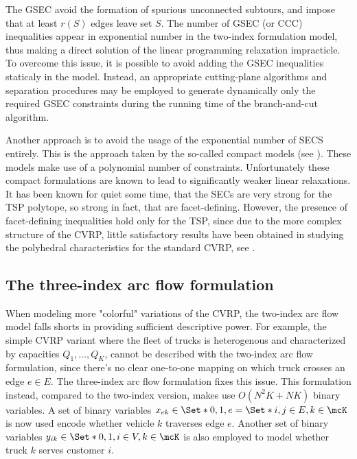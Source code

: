 The GSEC avoid the formation of spurious unconnected subtours, and impose that at least $r(S)$ edges leave set $S$.
The number of GSEC (or CCC) inequalities appear in exponential number in the two-index formulation model,
thus making a direct solution of the linear programming relaxation impracticle.
To overcome this issue, it is possible to avoid adding the GSEC inequalities staticaly in the model.
Instead, an appropriate cutting-plane algorithms and separation procedures may be employed to generate dynamically only the required
GSEC constraints during the running time of the branch-and-cut algorithm.

Another approach is to avoid the usage of the exponential number of SECS entirely.
This is the approach taken by the so-called compact models (see \cite{miller1960, christofides1979, desrochers1991}).
These models make use of a polynomial number of constraints.
Unfortunately these compact formulations are known to lead to significantly weaker linear relaxations.
It has been known for quiet some time, that the SECs are very strong for the TSP polytope, so strong in fact, that are facet-defining.
However, the presence of facet-defining inequalities hold only for the TSP, since due to the more complex structure of the CVRP,
little satisfactory results have been obtained in studying the polyhedral characteristics for the standard CVRP, see \textcite{campos1991, cornuejols1993}.


\subsection{The three-index arc flow formulation}
\label{sec:intro-cvrp-three-index-flow-formulation}

When modeling more "colorful" variations of the CVRP, the two-index arc flow model falls shorts in providing sufficient descriptive power.
For example, the simple CVRP variant where the fleet of trucks is heterogenous and characterized by capacities $Q_1, \dots, Q_K$,
cannot be described with the two-index arc flow formulation, since there's no clear one-to-one mapping on which truck crosses an edge $e \in E$.
The three-index arc flow formulation fixes this issue.
This formulation instead, compared to the two-index version, makes use $O(N^2 K + N K)$ binary variables.
A set of binary variables $x_{ek} \in \Set*{0, 1}, e = \Set*{i, j} \in E, k \in \mcK$ is now used encode whether vehicle $k$ traverses edge $e$.
Another set of binary variables $y_{ik} \in \Set*{0, 1}, i \in V, k \in \mcK$ is also employed to model whether truck $k$ serves customer $i$.


